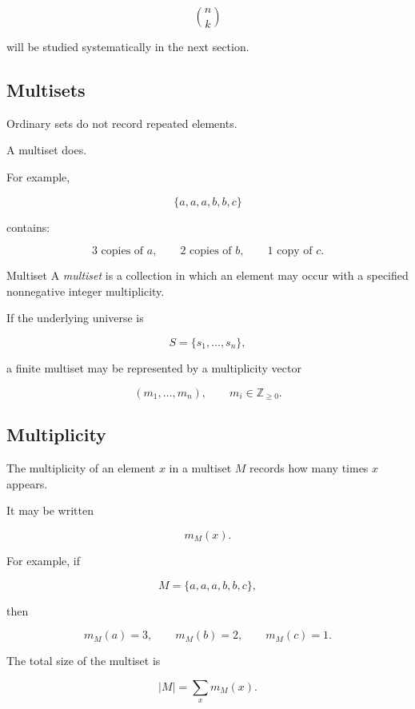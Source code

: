 \[
\binom{n}{k}
\]

will be studied systematically in the next section.

\subsection{Multisets}
\label{subsec:multisets}

Ordinary sets do not record repeated elements.

A multiset does.

For example,

\[
\{a,a,a,b,b,c\}
\]

contains:

\[
3\text{ copies of }a,
\qquad
2\text{ copies of }b,
\qquad
1\text{ copy of }c.
\]

\begin{definitionbox}{Multiset}
A \emph{multiset} is a collection in which an element may occur with a
specified nonnegative integer multiplicity.
\end{definitionbox}

If the underlying universe is

\[
S=\{s_1,\ldots,s_n\},
\]

a finite multiset may be represented by a multiplicity vector

\[
\boxed{
(m_1,\ldots,m_n),
\qquad
m_i\in\mathbb{Z}_{\geq0}.
}
\]

\subsection{Multiplicity}
\label{subsec:multiplicity}

The multiplicity of an element \(x\) in a multiset \(M\) records how
many times \(x\) appears.

It may be written

\[
m_M(x).
\]

For example, if

\[
M=\{a,a,a,b,b,c\},
\]

then

\[
m_M(a)=3,
\qquad
m_M(b)=2,
\qquad
m_M(c)=1.
\]

The total size of the multiset is

\[
\boxed{
|M|
=
\sum_x m_M(x).
}
\]

